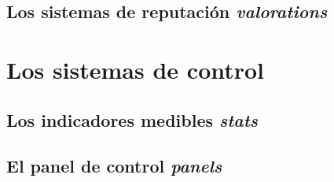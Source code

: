 \subsection{Los sistemas de reputación \emph{valorations}}


\section{Los sistemas de control}

\subsection{Los indicadores medibles \emph{stats}}
\subsection{El panel de control \emph{panels}}


